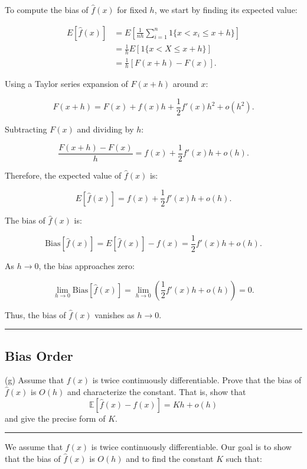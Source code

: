\documentclass{article}
\newenvironment{colorparagraph}[1]{\par\color{#1}}{\par}
\begin{document}
To compute the bias of \( \hat{f}(x) \) for fixed \( h \), we start by finding its expected value:

\[
\begin{aligned}
E[\hat{f}(x)] &= E\left[ \frac{1}{n h} \sum_{i=1}^n 1\{ x < x_i \leq x + h \} \right] \\
&= \frac{1}{h} E\left[ 1\{ x < X \leq x + h \} \right] \\
&= \frac{1}{h} \left[ F(x + h) - F(x) \right].
\end{aligned}
\]

Using a Taylor series expansion of \( F(x + h) \) around \( x \):

\[
F(x + h) = F(x) + f(x) h + \frac{1}{2} f'(x) h^2 + o(h^2).
\]

Subtracting \( F(x) \) and dividing by \( h \):

\[
\frac{F(x + h) - F(x)}{h} = f(x) + \frac{1}{2} f'(x) h + o(h).
\]

Therefore, the expected value of \( \hat{f}(x) \) is:

\[
E[\hat{f}(x)] = f(x) + \frac{1}{2} f'(x) h + o(h).
\]

The bias of \( \hat{f}(x) \) is:

\[
\text{Bias}[\hat{f}(x)] = E[\hat{f}(x)] - f(x) = \frac{1}{2} f'(x) h + o(h).
\]

As \( h \to 0 \), the bias approaches zero:

\[
\lim_{h \to 0} \text{Bias}[\hat{f}(x)] = \lim_{h \to 0} \left( \frac{1}{2} f'(x) h + o(h) \right) = 0.
\]

Thus, the bias of \( \hat{f}(x) \) vanishes as \( h \to 0 \).

\begin{colorparagraph}{questioncolor}
\label{q2g}
\rule{\textwidth}{0.5pt}
\subsection{Bias Order}
(g) Assume that \( f(x) \) is twice continuously differentiable. Prove that the bias of \( \hat{f}(x) \) is \( O(h) \) and characterize the constant. That is, show that
\[
\mathbb{E}[\hat{f}(x) - f(x)] = Kh + o(h)
\]
and give the precise form of \( K \).

\rule{\textwidth}{0.5pt}
\end{colorparagraph}

We assume that \( f(x) \) is twice continuously differentiable. Our goal is to show that the bias of \( \hat{f}(x) \) is \( O(h) \) and to find the constant \( K \) such that:
\end{document}
